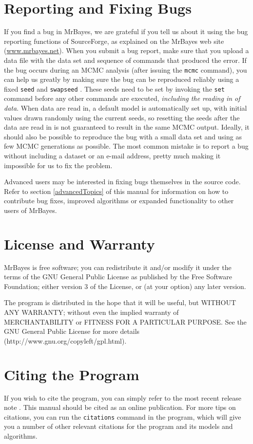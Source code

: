 \documentclass[12pt]{book}
\newcommand{\ttt}[1]{\texttt{#1} }
\begin{document}
\section{Reporting and Fixing Bugs}
If you find a bug in MrBayes, we are grateful if you tell us about it using the bug
reporting functions of SourceForge, as explained on the MrBayes web site
(\url{www.mrbayes.net}). When you submit a bug report, make sure that you upload a data file with
the data set and sequence of commands that produced the error. If the bug occurs during an
MCMC analysis (after issuing the \texttt{mcmc} command), you can help us greatly by making
sure the bug can be reproduced reliably using a fixed \ttt{seed} and \ttt{swapseed}. These seeds
need to be set by invoking the \ttt{set} command before any other commands are executed,
\emph{including the reading in of data}. When data are read in, a default model is automatically set up, with initial
values drawn randomly using the current seeds, so resetting the seeds after the data are read in
is not guaranteed to result in the same MCMC output. Ideally, it should also be possible to reproduce
the bug with a small data set and using as few MCMC generations as possible. The most common
mistake is to report a bug without including a dataset or an e-mail address, pretty much making it
impossible for us to fix the problem.

Advanced users may be interested in fixing bugs themselves in the source code. Refer to
section \ref{advancedTopics} of this manual for information on how to contribute bug fixes, improved
algorithms or expanded functionality to other users of MrBayes.
	 
\section{License and Warranty}
MrBayes is free software; you can redistribute it and/or modify it under the terms of the
GNU General Public License as published by the Free Software Foundation; either
version 3 of the License, or (at your option) any later version.

The program is distributed in the hope that it will be useful, but WITHOUT ANY
WARRANTY; without even the implied warranty of MERCHANTABILITY or
FITNESS FOR A PARTICULAR PURPOSE. See the GNU General Public License for
more details (http://www.gnu.org/copyleft/gpl.html).

\section{Citing the Program}
If you wish to cite the program, you can simply refer to the most recent release note \citep{ronquist11}.
This manual should be cited as an online publication. For more tips on citations, you can run
the \ttt{citations} command in the program, which will give you a number of other relevant citations for the program
and its models and algorithms.
\end{document}
